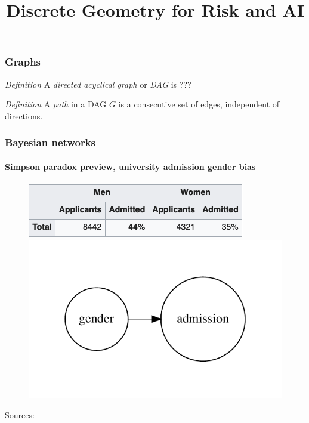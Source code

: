 


\title{Discrete Geometry for Risk and AI}

\maketitle

\begin{frame}
\frametitle{Graphs}

\emph{Definition} A \emph{directed acyclical graph} or \emph{DAG} is ??? \newline

\emph{Definition} A \emph{path} in a DAG $G$ is a consecutive set of edges, independent of directions. \newline

\end{frame}

\begin{frame}
  \frametitle{Bayesian networks}
  \framesubtitle{Simpson paradox preview, university admission gender bias}

  \begin{figure}[ht]
    \centering
            \includegraphics[height=0.15\textwidth]{graphics/berkeley} 
            \includegraphics[height=0.4\textwidth]{graphics/admission_original}
       
    \end{figure}
    Sources: \cite{simpson-wikipedia} \cite{freedman1998statistics}
\end{frame}

